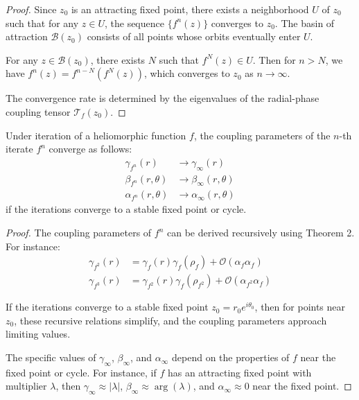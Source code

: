 \begin{proof}
Since $z_0$ is an attracting fixed point, there exists a neighborhood $U$ of $z_0$ such that for any $z \in U$, the sequence $\{f^n(z)\}$ converges to $z_0$. The basin of attraction $\mathcal{B}(z_0)$ consists of all points whose orbits eventually enter $U$.

For any $z \in \mathcal{B}(z_0)$, there exists $N$ such that $f^N(z) \in U$. Then for $n > N$, we have $f^n(z) = f^{n-N}(f^N(z))$, which converges to $z_0$ as $n \to \infty$.

The convergence rate is determined by the eigenvalues of the radial-phase coupling tensor $\mathcal{T}_f(z_0)$.
\end{proof}

\begin{theorem}
Under iteration of a heliomorphic function $f$, the coupling parameters of the $n$-th iterate $f^n$ converge as follows:
\begin{align}
\gamma_{f^n}(r) &\to \gamma_{\infty}(r)\\
\beta_{f^n}(r,\theta) &\to \beta_{\infty}(r,\theta)\\
\alpha_{f^n}(r,\theta) &\to \alpha_{\infty}(r,\theta)
\end{align}
if the iterations converge to a stable fixed point or cycle.
\end{theorem}

\begin{proof}
The coupling parameters of $f^n$ can be derived recursively using Theorem 2. For instance:
\begin{align}
\gamma_{f^2}(r) &= \gamma_f(r)\gamma_f(\rho_f) + \mathcal{O}(\alpha_f\alpha_f)\\
\gamma_{f^3}(r) &= \gamma_{f^2}(r)\gamma_f(\rho_{f^2}) + \mathcal{O}(\alpha_{f^2}\alpha_f)
\end{align}

If the iterations converge to a stable fixed point $z_0 = r_0e^{i\theta_0}$, then for points near $z_0$, these recursive relations simplify, and the coupling parameters approach limiting values.

The specific values of $\gamma_{\infty}$, $\beta_{\infty}$, and $\alpha_{\infty}$ depend on the properties of $f$ near the fixed point or cycle. For instance, if $f$ has an attracting fixed point with multiplier $\lambda$, then $\gamma_{\infty} \approx |\lambda|$, $\beta_{\infty} \approx \arg(\lambda)$, and $\alpha_{\infty} \approx 0$ near the fixed point.
\end{proof}


